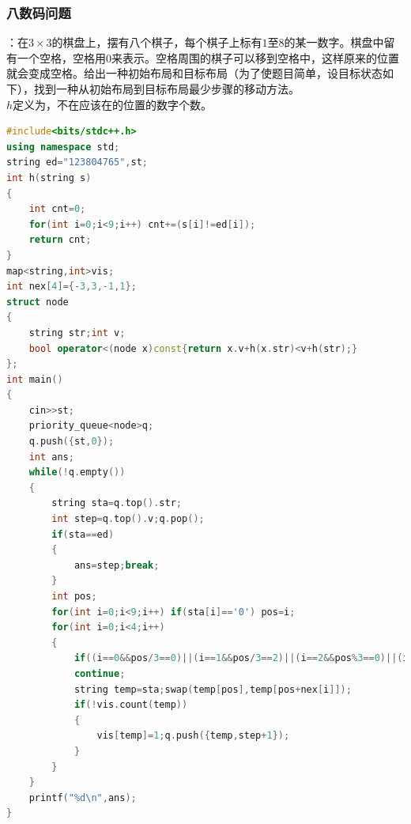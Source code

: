 \documentclass[a4paper]{book}
\begin{document}
\subsubsection{八数码问题}
：在$3\times3$的棋盘上，摆有八个棋子，每个棋子上标有$1$至$8$的某一数字。棋盘中留有一个空格，空格用$0$来表示。空格周围的棋子可以移到空格中，这样原来的位置就会变成空格。给出一种初始布局和目标布局（为了使题目简单，设目标状态如下），找到一种从初始布局到目标布局最少步骤的移动方法。\\
$h$定义为，不在应该在的位置的数字个数。
\begin{lstlisting}[language=C++]
#include<bits/stdc++.h>
using namespace std;
string ed="123804765",st;
int h(string s)
{
    int cnt=0;
    for(int i=0;i<9;i++) cnt+=(s[i]!=ed[i]);
    return cnt;
}
map<string,int>vis;
int nex[4]={-3,3,-1,1};
struct node
{
    string str;int v;
    bool operator<(node x)const{return x.v+h(x.str)<v+h(str);}
};
int main()
{
    cin>>st;
    priority_queue<node>q;
    q.push({st,0});
    int ans;
    while(!q.empty())
    {
        string sta=q.top().str;
        int step=q.top().v;q.pop();
        if(sta==ed)
        {
            ans=step;break;
        }
        int pos;
        for(int i=0;i<9;i++) if(sta[i]=='0') pos=i;
        for(int i=0;i<4;i++)
        {
            if((i==0&&pos/3==0)||(i==1&&pos/3==2)||(i==2&&pos%3==0)||(i==3&&pos%3==2))
            continue;
            string temp=sta;swap(temp[pos],temp[pos+nex[i]]);
            if(!vis.count(temp))
            {
                vis[temp]=1;q.push({temp,step+1});
            }
        }
    }
    printf("%d\n",ans);
}
\end{lstlisting}
\end{document}
